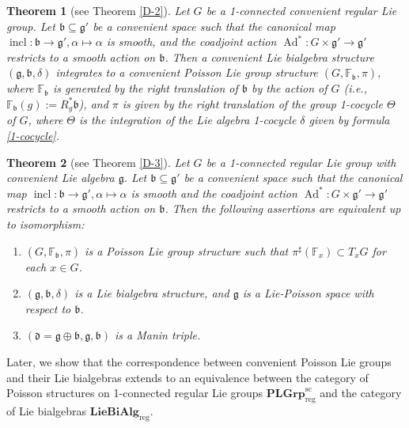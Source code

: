 \documentclass[11pt,reqno]{amsart}
\newtheorem{theorem}{Theorem}[section]
\theoremstyle{definition}
\newcommand{\CatPL}{\mathbf{PLGrp}_{\text{reg}}^{\text{sc}}}
\newcommand{\CatLB}{\mathbf{LieBiAlg}_{\text{reg}}}
\numberwithin{equation}{section}
\begin{document}
\begin{theorem}[see Theorem \ref{D-2}]
    Let $G$ be a 1-connected convenient regular Lie group. Let $\mathfrak{b} \subseteq \mathfrak{g}'$ be a convenient space such that the canonical map $\operatorname{incl}: \mathfrak{b} \to \mathfrak{g}', \alpha \mapsto \alpha$ is smooth, and the coadjoint action $\operatorname{Ad}^*: G \times \mathfrak{g}' \to \mathfrak{g}'$ restricts to a smooth action on $\mathfrak{b}$. Then a convenient Lie bialgebra structure $(\mathfrak{g}, \mathfrak{b}, \delta)$ integrates to a convenient Poisson Lie group structure $(G, \mathbb{F}_{\mathfrak{b}}, \pi)$, where $\mathbb{F}_{\mathfrak{b}}$ is generated by the right translation of $\mathfrak{b}$ by the action of $G$ (i.e., $\mathbb{F}_{\mathfrak{b}}(g) := R_{g}^*\mathfrak{b}$), and $\pi$ is given by the right translation of the group 1-cocycle $\Theta$ of $G$, where $\Theta$ is the integration of the Lie algebra 1-cocycle $\delta$ given by formula \eqref{1-cocycle}.
\end{theorem}

\begin{theorem}[see Theorem \ref{D-3}]
    Let $G$ be a 1-connected regular Lie group with convenient Lie algebra $\mathfrak{g}$. Let $\mathfrak{b} \subseteq \mathfrak{g}'$ be a convenient space such that the canonical map $\operatorname{incl}: \mathfrak{b} \to \mathfrak{g}', \alpha \mapsto \alpha$ is smooth and the coadjoint action $\operatorname{Ad}^*: G \times \mathfrak{g}' \to \mathfrak{g}'$ restricts to a smooth action on $\mathfrak{b}$. Then the following assertions are equivalent up to isomorphism:
    \begin{enumerate}
        \item $(G, \mathbb{F}_{\mathfrak{b}}, \pi)$ is a Poisson Lie group structure such that $\pi^{\sharp}(\mathbb{F}_x) \subset T_xG$ for each $x \in G$.
        \item $(\mathfrak{g}, \mathfrak{b}, \delta)$ is a Lie bialgebra structure, and $\mathfrak{g}$ is a Lie-Poisson space with respect to $\mathfrak{b}$.
        \item $(\mathfrak{d} = \mathfrak{g} \oplus \mathfrak{b}, \mathfrak{g}, \mathfrak{b})$ is a Manin triple.
    \end{enumerate}
\end{theorem}

Later, we show that the correspondence between convenient Poisson Lie groups and their Lie bialgebras extends to an equivalence between the category of Poisson structures on 1-connected regular Lie groups $\CatPL$ and the category of Lie bialgebras $\CatLB$.
\end{document}
